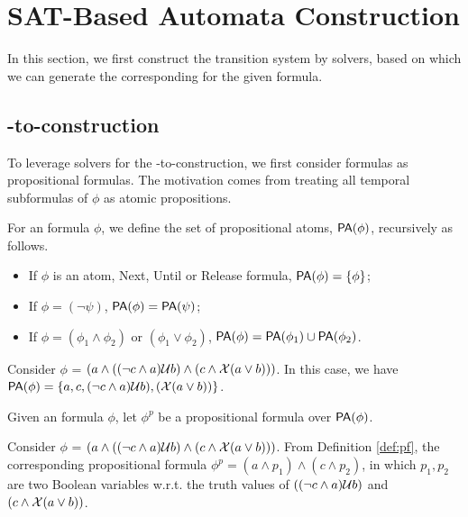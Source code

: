 \section{SAT-Based Automata Construction}

In this section, we first construct the \ltlf transition system by \SAT solvers, based on which we can generate the corresponding \NFA for the given \ltlf formula. 

\subsection{\ltlf-to-\NFA construction }

To leverage \SAT solvers for the \ltlf-to-\NFA construction, we first consider \ltlf formulas as propositional formulas. The motivation comes from treating all temporal subformulas of $\phi$ as atomic propositions. 

\begin{definition}\label{def:pa}
For an \ltlf formula $\phi$, we define the set of propositional atoms, ${\sf PA}(\phi)$, recursively as follows.
\begin{itemize}
	\item If $\phi$ is an atom, Next, Until or Release formula, ${\sf PA}(\phi)=\{\phi\}$;
	\item If $\phi = (\neg \psi)$, ${\sf PA}(\phi)= {\sf PA}(\psi)$;
	\item If $\phi = (\phi_1 \wedge \phi_2)$ or $(\phi_1 \vee \phi_2)$, ${\sf PA}(\phi) = {\sf PA}(\phi_1) \cup {\sf PA}(\phi_2)$.
\end{itemize}
\end{definition}

Consider $\phi$ = $(a \wedge ((\neg c \wedge a)\mathcal{U} b) \wedge (c \wedge \mathcal{X} (a \vee b)))$. In this case, we have ${\sf PA}(\phi)=\{a, c, (\neg c \wedge a)\mathcal{U} b), (\mathcal{X} (a \vee b))\}$. 

\begin{definition}\label{def:pf}
Given an \ltlf formula $\phi$, let $\phi^{p}$ be a propositional formula over ${\sf PA}(\phi)$. 
\end{definition}

Consider $\phi$ = $(a \wedge ((\neg c \wedge a)\mathcal{U} b) \wedge (c \wedge \mathcal{X} (a \vee b)))$. From Definition \ref{def:pf}, the corresponding propositional formula $\phi^p = (a \wedge p_1) \wedge (c \wedge p_2)$, in which $p_1, p_2$ are two Boolean variables w.r.t. the truth values of $((\neg c \wedge a)\mathcal{U} b)$ and $(c \wedge \mathcal{X} (a \vee b))$. 

